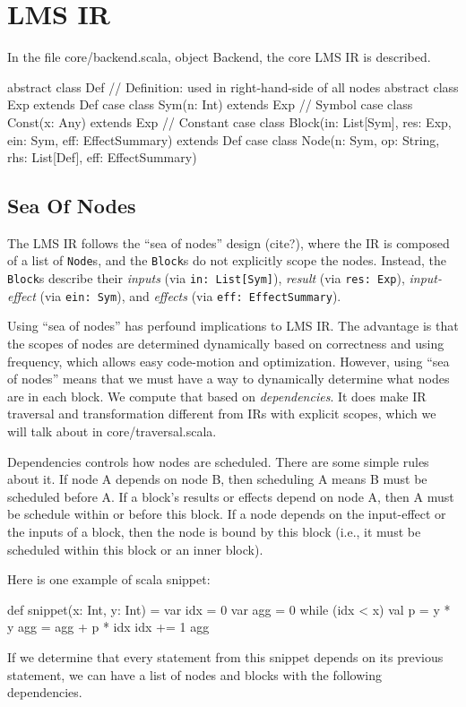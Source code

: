 \section{LMS IR}

In the file core/backend.scala, object Backend, the core LMS IR is described.

\begin{listing}[scala]
abstract class Def // Definition: used in right-hand-side of all nodes
abstract class Exp extends Def
case class Sym(n: Int) extends Exp   // Symbol
case class Const(x: Any) extends Exp // Constant
case class Block(in: List[Sym], res: Exp, ein: Sym, eff: EffectSummary) extends Def
case class Node(n: Sym, op: String, rhs: List[Def], eff: EffectSummary)
\end{listing}

\subsection{Sea Of Nodes}\label{sec:node}

The LMS IR follows the ``sea of nodes'' design (cite?), where the IR is composed of
a list of \texttt{Node}s, and the \texttt{Block}s do not explicitly scope the nodes.
Instead, the \texttt{Block}s describe their \emph{inputs} (via \texttt{in: List[Sym]}),
\emph{result} (via \texttt{res: Exp}), \emph{input-effect} (via \texttt{ein: Sym}), and
\emph{effects} (via \texttt{eff: EffectSummary}).

Using ``sea of nodes'' has perfound implications to LMS IR. The advantage is that
the scopes of nodes are determined dynamically based on correctness and using frequency,
which allows easy code-motion and optimization. However, using ``sea of nodes'' means that
we must have a way to dynamically determine what nodes are in each block. We compute that
based on \emph{dependencies}.  It does make IR traversal and transformation different from
IRs with explicit scopes, which we will talk about in core/traversal.scala.

Dependencies controls how nodes are scheduled. There are some simple rules about it.
If node A depends on node B, then scheduling A means B must be scheduled before A.
If a block's results or effects depend on node A, then A must be schedule within or before this block.
If a node depends on the input-effect or the inputs of a block, then the node is bound by
this block (i.e., it must be scheduled within this block or an inner block).

Here is one example of scala snippet:
\begin{listing}[scala]
def snippet(x: Int, y: Int) = {
  var idx = 0
  var agg = 0
  while (idx < x) {
    val p = y * y
    agg = agg + p * idx
    idx += 1
  }
  agg
}
\end{listing}
If we determine that every statement from this snippet depends on its previous statement,
we can have a list of nodes and blocks with the following dependencies.

